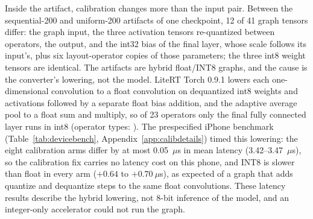 \documentclass[10pt,twocolumn]{article}
\begin{document}
Inside the artifact, calibration changes more than the input pair. Between
the sequential-200 and uniform-200 artifacts of one checkpoint, 12 of 41
graph tensors differ: the graph input, the three activation tensors
re-quantized between operators, the output, and the int32 bias of the
final layer, whose scale follows its input's, plus six layout-operator
copies of those parameters; the three int8 weight tensors are identical.
The artifacts are hybrid float/INT8 graphs, and the cause is the
converter's lowering, not the model. LiteRT Torch 0.9.1 lowers each
one-dimensional convolution to a float convolution on dequantized int8
weights and activations followed by a separate float bias addition, and
the adaptive average pool to a float sum and multiply, so of 23 operators
only the final fully connected layer runs in int8 (operator types:
). The prespecified iPhone benchmark
(Table~\ref{tab:devicebench}, Appendix~\ref{app:calibdetails}) timed this
lowering: the eight calibration arms differ by at most 0.05~$\mu$s in
mean latency (3.42--3.47~$\mu$s), so the calibration fix carries no
latency cost on this phone, and INT8 is slower than float in every arm
($+0.64$ to $+0.70~\mu$s), as expected of a graph that adds quantize and
dequantize steps to the same float convolutions. These latency results
describe the hybrid lowering, not 8-bit inference of the model, and an
integer-only accelerator could not run the graph.
\end{document}
